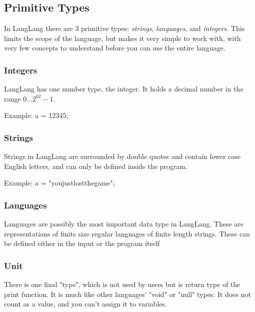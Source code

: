 \subsection{Primitive Types}
\begin{normalsize}
In LangLang there are 3 primitive types: \textit{strings}, \textit{languages}, and \textit{integers}. This limits the scope of the language, but makes it very simple to work with, with very few concepts to understand before you can use the entire language.
\end{normalsize}

\subsubsection{Integers}
\begin{normalsize}
LangLang has one number type, the integer. It holds a decimal number in the range $ 0 ... 2^{62}-1 $.

Example:
a = 12345;
\end{normalsize}

\subsubsection{Strings}
\begin{normalsize}
Strings in LangLang are surrounded by double quotes and contain lower case English letters, and can only be defined inside the program.

Example:
a = "youjustlostthegame";

\end{normalsize}
\subsubsection{Languages}
\begin{normalsize}
Languages are possibly the most important data type in LangLang. These are representations of finite size regular languages of finite length strings. These can be defined either in the input or the program itself
\end{normalsize}

\subsubsection{Unit}
\begin{normalsize}
There is one final "type", which is not used by users but is return type of the print function. It is much like other languages' "void" or "null" types: It does not count as a value, and you can't assign it to variables.
\end{normalsize}
